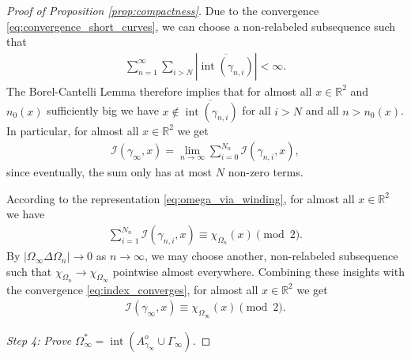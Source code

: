 \documentclass[11pt]{article}
\numberwithin{statement}{section}
\numberwithin{equation}{section}
\theoremstyle{remark}
\newcommand{\R}{\mathbb R} 				%
\begin{document}
\begin{proof}[Proof of Proposition \ref{prop:compactness}]
	Due to the convergence \eqref{eq:convergence_short_curves}, we
        can choose a non-relabeled subsequence
        such that
	\begin{align}
		\sum_{n=1}^\infty \sum_{i > N} \left| \overline{\operatorname{int}(\gamma_{n,i})}\right| < \infty. 
	\end{align}
	The Borel-Cantelli Lemma \cite[p.\ 42]{stein-shakarchi}
        therefore implies that for almost all $x \in \R^2 $ and
        $n_0(x)$ sufficiently big we have
        $ x \not \in \overline{\operatorname{int}(\gamma_{n,i})}$ for
        all $i >N$ and all $n> n_0(x)$.  In particular, for almost all
        $ x \in \R^2$ we get
	\begin{align}\label{eq:index_converges}
		\mathcal{I}(\gamma_\infty,  x) = \lim_{n \to \infty}
          \sum_{i=0}^{N_{n}} \mathcal{I}(\gamma_{{n},i},  x),
	\end{align}
	since eventually, the sum only has at most $N$ non-zero
        terms.
	
	According to the representation \eqref{eq:omega_via_winding},
        for almost all $ x \in \R^2$ we have \begin{align}
          \sum_{i=1}^{N_{n}} \mathcal{I}(\gamma_{n,i}, x) \equiv
          \chi_{\Omega_n}(x) \pmod{2}.
	\end{align}
	By $| \Omega_\infty \Delta \Omega_{n}| \to 0$ as $n \to
        \infty$, we may choose another, non-relabeled subsequence such
        that $\chi_{\Omega_n} \to \chi_{\Omega_\infty}$ pointwise
        almost everywhere.  Combining these insights with the
        convergence \eqref{eq:index_converges}, for almost all
        $x \in \R^2$ we get
        \begin{align}
          \mathcal{I}(\gamma_\infty,  x)  \equiv \chi_{\Omega_\infty}
          (x) \pmod{2}. 
        \end{align}


	
        \textit{Step 4: Prove
          $\Omega_\infty^*=
          \operatorname{int}\left(A_{\gamma_\infty}^o \cup
            \Gamma_\infty \right)$.}
	

\end{proof}
\end{document}
